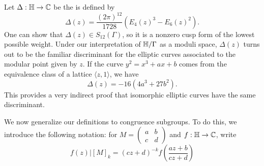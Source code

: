 \documentclass[12pt, a4paper]{report}
\begin{document}
\begin{example}
  Let $\Delta : \mathbb{H} \rightarrow {\mathbb C} $ be the  is defined by
  \[\Delta(z) = \frac{(2\pi)^{12}}{1728} \left( E_4(z)^3 - E_6(z)^2 \right).\]
  One can show that $\Delta(z) \in S_{12}(\Gamma)$, so it is a nonzero
  cusp form of the lowest
  possible weight. Under our interpretation of $\mathbb{H}/\Gamma$ as a moduli space,
  $\Delta(z)$ turns out to be the familiar discriminant for
  the elliptic curves associated to the modular point given by $z$.
  If the curve $y^2 = x^3 + ax + b$ comes from the equivalence class of a lattice
  $\langle z,1 \rangle$, we have
  \[\Delta(z) = -16(4a^3 + 27b^2).\]
  This provides a very indirect proof that isomorphic elliptic curves have
  the same discriminant.
\end{example}

We now generalize our definitions to congruence subgroups. To do this, we
introduce the following notation: for $M = \left(
  \begin{smallmatrix}
    a & b \\ c & d
  \end{smallmatrix}
\right)$ and $f : \mathbb{H} \rightarrow {\mathbb C}$, write
\[f (z) | [M]_k = (cz+d)^{-k} f\left( \frac{az+b}{cz+d} \right)\]
\end{document}
